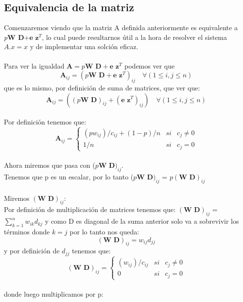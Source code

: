 \subsection{Equivalencia de la matriz}
Comenzaremos viendo que la matriz A definida anteriormente es equivalente a \textit{p}\textbf{W D}+$ \textbf{e z}^T$, lo cual puede resultarnos \'util a la hora de resolver el sistema $A.x = x$ y de implementar una solci\'on eficaz.
 \\
 \\
Para ver la igualdad $\textbf{A} = \textit{p} \textbf{W D} + \textbf{e z}^T$ podemos ver que
\begin{equation*}
\textbf{A}_{ij} = (\textit{p} \textbf{W D} + \textbf{e z}^T)_{ij} \quad   \forall ( 1 \leq i, j \leq n)
\end{equation*}
que es lo mismo, por definición de suma de matrices, que ver que:
\begin{equation*}
\textbf{A}_{ij} = ((\textit{p} \textbf{W D})_{ij} + (\textbf{e z}^T)_{ij})  \quad  \forall ( 1 \leq i, j \leq n)
\end{equation*}
 \\
Por definición tenemos que:
\begin{equation*}
\textbf{A}_{ij} =  \left\{ \begin{array}{lcc}
 (p w_{ij})/ c_{ij} + (1-p)/n & si & c_{j} \neq 0
\\ 1 / n &si& c_{j} = 0
\end{array}
\right.
\end{equation*}
 \\
Ahora miremos que pasa con ($\textit{p} \textbf{W D})_{ij} $.\\
Tenemos que p es un escalar, por lo tanto ($\textit{p} \textbf{W D})_{ij} $ = $\textit{p} (\textbf{W D})_{ij} $
\\
\\
Miremos $(\textbf{W D})_{ij} $:
\\
Por definición de multiplicación de matrices tenemos que: $(\textbf{W D})_{ij} $ = $\displaystyle \sum_{k=1}^{n} w_{ik} d_{kj}$ y como D es diagonal de la suma anterior solo va a sobrevivir los términos donde $k=j$ por lo tanto nos queda:
\begin{equation*}
(\textbf{W D})_{ij}  = w_{ij} d_{jj}
\end{equation*}
y por definición de $d_{jj}$ tenemos que:
\begin{equation*}
(\textbf{W D})_{ij} =  \left\{ \begin{array}{lcc}
 (w_{ij}) / c_{ij}  & si & c_{j} \neq 0
\\ 0 &si& c_{j} = 0
\end{array}
\right.
\end{equation*}
 \\
donde luego multiplicamos por p:

